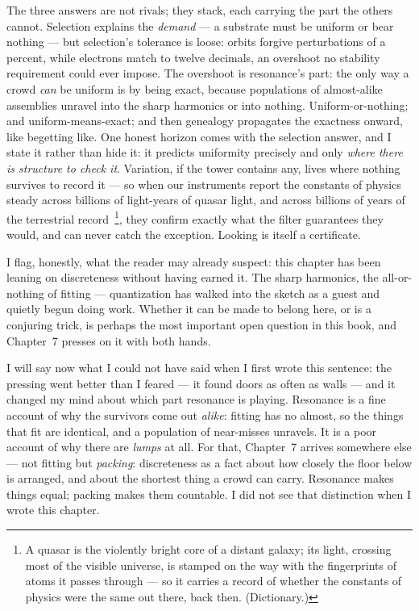 \documentclass[fontsize=11pt,paper=a4,pagesize=auto,parskip=half-]{scrbook}
\newcommand{\Ixtmp}{}
\DeclareRobustCommand{\Ix}[1]{%
  #1%
  \begingroup
    \lowercase{\gdef\Ixtmp{#1}}%
    \expandafter\index\expandafter{\Ixtmp}%
  \endgroup}
\begin{document}
The three answers are not rivals; they stack, each carrying the part the others cannot. Selection explains the \emph{demand} --- a substrate must be uniform or bear nothing --- but selection's tolerance is loose: orbits forgive perturbations of a percent, while electrons match to twelve decimals, an overshoot no stability requirement could ever impose. The overshoot is resonance's part: the only way a crowd \emph{can} be uniform is by being exact, because populations of almost-alike assemblies unravel into the sharp harmonics or into nothing. Uniform-or-nothing; and uniform-means-exact; and then genealogy propagates the exactness onward, like begetting like. One honest horizon comes with the selection answer, and I state it rather than hide it: it predicts uniformity precisely and only \emph{where there is structure to check it}. Variation, if the tower contains any, lives where nothing survives to record it --- so when our instruments report the constants of physics steady across billions of light-years of quasar light, and across billions of years of the terrestrial record~\cite{uzan2003,damourdyson1996}\footnote{A quasar is the violently bright core of a distant galaxy; its light, crossing most of the visible universe, is stamped on the way with the fingerprints of atoms it passes through --- so it carries a record of whether the constants of physics were the same out there, back then. (Dictionary.)}, they confirm exactly what the filter guarantees they would, and can never catch the exception. Looking is itself a certificate.

I flag, honestly, what the reader may already suspect: this chapter has been leaning on discreteness without having earned it. The sharp harmonics, the all-or-nothing of fitting --- \Ix{quantization} has walked into the sketch as a guest and quietly begun doing work. Whether it can be made to belong here, or is a conjuring trick, is perhaps the most important open question in this book, and Chapter~7 presses on it with both hands.

I will say now what I could not have said when I first wrote this sentence: the pressing went better than I feared --- it found doors as often as walls --- and it changed my mind about which part resonance is playing. Resonance is a fine account of why the survivors come out \emph{alike}: fitting has no almost, so the things that fit are identical, and a population of near-misses unravels. It is a poor account of why there are \emph{lumps} at all. For that, Chapter~7 arrives somewhere else --- not fitting but \emph{packing}: discreteness as a fact about how closely the floor below is arranged, and about the shortest thing a crowd can carry. Resonance makes things equal; packing makes them countable. I did not see that distinction when I wrote this chapter.
\end{document}

